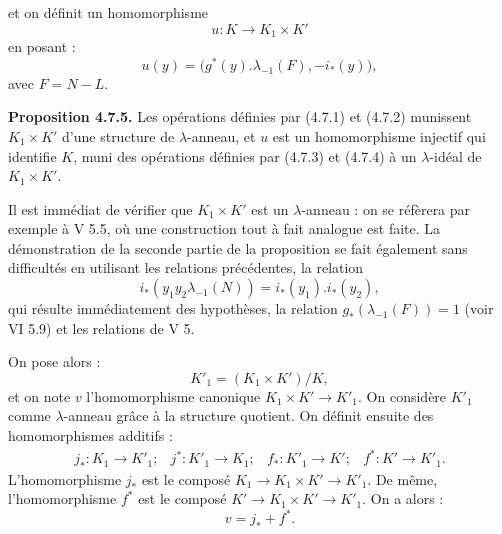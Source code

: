 et on
définit un homomorphisme
\[
  u:K\longrightarrow K_1\times K'
\]
en posant :
\[
  u(y)=\bigl(g^*(y).\lambda_{-1}(F),-i_*(y)\bigr),
\]
avec \(F=N-L\).

\textbf{Proposition 4.7.5.} Les opérations définies par (4.7.1) et (4.7.2) munissent \(K_1\times K'\) d'une structure de \(\lambda\)-anneau, et \(u\) est un homomorphisme injectif qui identifie \(K\), muni des opérations définies par (4.7.3) et (4.7.4) à un \(\lambda\)-idéal de \(K_1\times K'\).

Il est immédiat de vérifier que \(K_1\times K'\) est un \(\lambda\)-anneau : on se réfèrera par exemple à V 5.5, où une construction tout à fait analogue est faite. La démonstration de la seconde partie de la proposition se fait également sans difficultés en utilisant les relations précédentes, la relation
\[
  i_*(y_1y_2\lambda_{-1}(N))=i_*(y_1).i_*(y_2),
\]
qui résulte immédiatement des hypothèses, la relation \(g_*(\lambda_{-1}(F))=1\) (voir VI 5.9) et les relations de V 5.

On pose alors :
\[
  K'_1=(K_1\times K')/K,
\]
et on note \(v\) l'homomorphisme canonique \(K_1\times K'\to K'_1\). On considère \(K'_1\) comme \(\lambda\)-anneau grâce à la structure quotient. On définit ensuite des homomorphismes additifs :
\[
\begin{array}{llll}
j_*:K_1\to K'_1; & j^*:K'_1\to K_1; &
f_*:K'_1\to K'; & f^*:K'\to K'_1 .
\end{array}
\]
L'homomorphisme \(j_*\) est le composé \(K_1\to K_1\times K'\to K'_1\). De même, l'homomorphisme \(f^*\) est le composé \(K'\to K_1\times K'\to K'_1\). On a alors :
\[
  v=j_*+f^*.
\]

